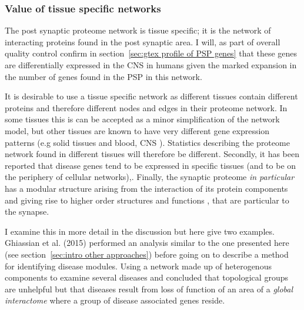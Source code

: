 
\subsubsection{Value of tissue specific networks}
\label{sec:value_of_tissue_specific_networks}

The post synaptic proteome network is tissue specific; it is the network of interacting proteins found in the post synaptic area. I will, as part of overall quality control confirm in section~\ref{sec:gtex profile of PSP genes} that these genes are differentially expressed in the CNS in humans given the marked expansion in the number of genes found in the PSP in this network.

It is desirable to use a tissue specific network as different tissues contain different proteins and therefore different nodes and edges in their proteome network. In some tissues this is can be accepted as a minor simplification of the network model, but other tissues are known to have very different gene expression patterns (e.g solid tissues and blood, CNS \cite{mele2015human}). Statistics describing the proteome network found in different tissues will therefore be different. Secondly, it has been reported that disease genes tend to be expressed in specific tissues (and to be on the periphery of cellular networks)\cite{barabasi2011network},\cite{kitsak2016tissue}. Finally, the synaptic proteome \textit{in particular} has a modular structure arising from the interaction of its protein components and giving rise to higher order structures and functions \cite{pocklington2006organization},\cite{grant2012synaptopathies} that are particular to the synapse. 

I examine this in more detail in the discussion but here give two examples. Ghiassian et al. (2015) \cite{ghiassian2015disease} performed an analysis similar to the one presented here (see section~\ref{sec:intro other approaches}) before going on to describe a method for identifying disease modules.
Using a network made up of heterogenous components to examine several diseases and concluded that topological groups are unhelpful but that diseases result from loss of function of an area of a \textit{global interactome} where a group of disease associated genes reside. 


